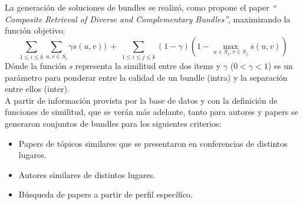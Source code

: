 La generación de soluciones de bundles se realizó, como propone el paper \textit{\textquotedblleft 
Composite Retrieval of Diverse and Complementary Bundles\textquotedblright}, maximizando la función 
objetivo: $$\displaystyle\sum_{1 \leq i \leq k} \displaystyle\sum_{u,v \in S_{i}} \gamma s(u,v))\ 
+\ \displaystyle\sum_{1 \leq i \leq j \leq k} (1-\gamma) (1 - \displaystyle\max_{u \in S_{1}, v 
\in S_{j}} s(u,v))$$ Dónde la función \textit{s} representa la similitud entre dos items y 
$\gamma$ ($0 < \gamma < 1$) es un parámetro para ponderar entre la calidad de un bundle (intra) y 
la separación entre ellos (inter).\\
A partir de información provista por la base de datos y con la definición de funciones de 
similitud, que se verán más adelante, tanto para autores y papers se generaron conjuntos de bundles 
para los siguientes criterios:
\begin{itemize}
 \item Papers de tópicos similares que se presentaron en conferencias de 
distintos lugares.
 \item Autores similares de distintos lugares.
 \item Búsqueda de papers a partir de perfil específico.
\end{itemize}